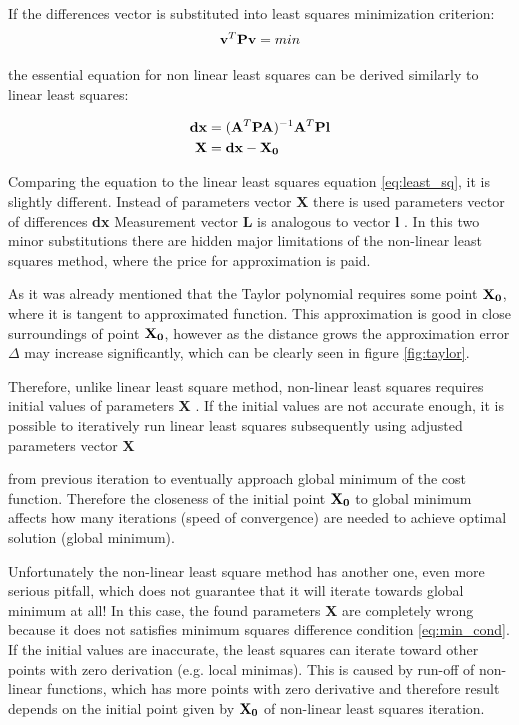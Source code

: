 \documentclass[a4paper,12pt]{article}
\newcommand{\ematr}[1]{
{\bf #1}
}
\newcommand{\evect}[1]{
{\bf #1}
}
\begin{document}
If the differences vector is substituted into least squares minimization criterion:
\begin{equation}
\label{eq:min_cond}
\evect{v}^{T}  \ematr{P} \evect{v} = min
\end{equation}

the essential equation for non linear least squares can be derived 
similarly to linear least squares:

\begin{equation}
\begin{split}
\label{eq:non_least_sq}
\evect{dx} &= (\ematr{A}^{T} \ematr{P} \ematr{A})^{-1} \ematr{A}^{T} \ematr{P} \ematr{l} \\
\evect{X} &=  {\evect{dx} -  \evect{X_{0}}} \\
\end{split}
\end{equation}


Comparing the equation to the linear least squares equation \eqref{eq:least_sq},
 it is slightly different. Instead of parameters vector \evect{X} there is used 
parameters vector of differences \evect{dx} Measurement vector \evect{L} is analogous to vector \evect{l}. In this two minor 
substitutions there are hidden major limitations of the non-linear least squares method, 
where the price for approximation is paid. 

As it was already mentioned that the Taylor polynomial requires some point $\evect{X_{0}}$, where it is tangent to 
approximated function.
This approximation is good in close surroundings of point $\evect{X_{0}}$, however as the distance 
grows the approximation error $\Delta$ may increase significantly, which can be clearly seen in figure \ref{fig:taylor}.

Therefore, unlike linear least square method, non-linear least squares requires initial 
values of parameters \evect{X}. If the initial values are not accurate 
enough, it is possible to iteratively run linear least squares subsequently using adjusted parameters vector \evect{X}
from previous iteration to eventually approach global minimum of the cost function. 
Therefore the closeness of the initial point $\evect{X_{0}}$ to global minimum affects how many iterations (speed of convergence)
are needed to achieve optimal solution (global minimum).

Unfortunately the non-linear least square method has another one, even more serious pitfall, which 
does not guarantee that it will iterate towards global minimum at all!
In this case, the found parameters \evect{X} are completely wrong because 
it does not satisfies minimum squares difference condition \eqref{eq:min_cond}. If the initial values are 
inaccurate, the least squares can iterate toward other points with zero derivation (e.g. local minimas).  
This is caused by run-off of non-linear functions, which has more points with zero derivative
and therefore result depends on the initial point given by $\evect{X_{0}}$  of non-linear least squares iteration.
\end{document}
